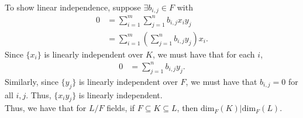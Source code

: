 \documentclass[10pt]{extarticle}
\begin{document}
  To show linear independence, suppose $\exists b_{i,j}\in F$ with
  \begin{align*}
    0 &= \sum_{i=1}^{m}\sum_{j=1}^{n}b_{i,j}x_iy_j\\
      &= \sum_{i=1}^{m}\left(\sum_{j=1}^{n}b_{i,j}y_j\right)x_i.
  \end{align*}
  Since $\{x_i\}$ is linearly independent over $K$, we must have that for each $i$,
  \begin{align*}
    0 &= \sum_{j=1}^{n}b_{i,j}y_j.
  \end{align*}
  Similarly, since $\{y_j\}$ is linearly independent over $F$, we must have that $b_{i,j} = 0$ for all $i,j$. Thus, $\{x_iy_j\}$ is linearly independent.\\

  Thus, we have that for $L/F$ fields, if $F\subseteq K \subseteq L$, then $\text{dim}_{F}(K)|\text{dim}_{F}(L)$.
\end{document}
